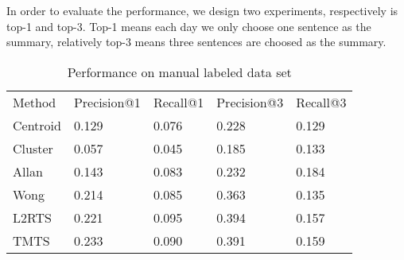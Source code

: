 \documentclass{acm_proc_article-sp}
\begin{document}





In order to evaluate the performance, we design two experiments, respectively is top-1 and top-3. Top-1 means each day we only choose one sentence as the summary, relatively top-3 means three sentences are choosed as the summary.

\begin{table}
\caption{Performance on manual labeled data set}
\centering
\begin{tabular}{lllll}
\hline\noalign{\smallskip}
Method   &  Precision@1 & Recall@1  & Precision@3 & Recall@3 \\
\noalign{\smallskip}
\hline
\noalign{\smallskip}
Centroid &	0.129			& 		0.076	 			&	0.228			& 0.129			 				\\
Cluster	&	0.057			&		0.045				&	0.185			& 	0.133		 				\\
Allan		&	0.143			&		0.083				&	0.232			& 0.184			 			\\
Wong		&	0.214			&		0.085				&	0.363			& 0.135						\\
L2RTS	&	0.221			&		0.095				&	0.394			& 0.157			 				\\
TMTS	&	0.233			&		0.090				&	0.391			& 0.159							\\
\hline
\end{tabular}
\end{table}
\end{document}
